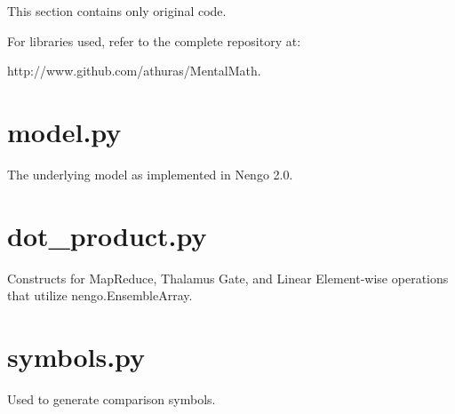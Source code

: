 \documentclass{report}
\begin{document}
\newpage



\newpage

\begin{appendices}
This section contains only original code.

For libraries used, refer to the complete repository at:

http://www.github.com/athuras/MentalMath.

\chapter{model.py}
The underlying model as implemented in Nengo 2.0.


\chapter{dot\_product.py}
\label{app:dot_product.py}
Constructs for MapReduce, Thalamus Gate, and Linear Element-wise operations that utilize nengo.EnsembleArray.


\chapter{symbols.py}
Used to generate comparison symbols.


\end{appendices}
\end{document}
